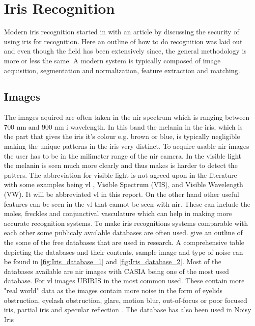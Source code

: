 \section{Iris Recognition}
\label{sec:Iris_Recognition_Research}
Modern iris recognition started in with an article by \cite{Daugman1993} discussing the security of using iris for recognition. Here an outline of how to do recognition was laid out and even though the field has been  extensively since, the general methodology is more or less the same. A modern system is typically composed of image acquisition, segmentation and normalization, feature extraction and matching. 

\subsection{Images}
The images aquired are often taken in the \gls{nir} spectrum which is ranging between 700 nm and 900 nm i wavelength. In this band the melanin in the iris, which is the part that gives the iris it's colour e.g. brown or blue, is typically negligible making the unique patterns in the iris very distinct. To acquire usable \gls{nir} images the user has to be in the milimeter range of the \gls{nir} camera.  In the visible light the melanin is seen much more clearly and thus makes is harder to detect the patters. The abbreviation for visible light is not agreed upon in the literature with some examples being \gls{vl} , Visible Spectrum (VIS), and Visible Wavelength (VW). It will be abbreviated \gls{vl}  in this report. On the other hand other useful features can be seen in the \gls{vl} that cannot be seen with \gls{nir}. These can include the moles, freckles and conjunctival vasculature which can help in making more accurate recognition systems. To make iris recognitions systems comparable with each other some publicaly available databases are often used. \cite{RifaeeMustafaandAbdallahMohammadandOkosh2017}  give an outline of the some of the free databases that are used in research. A comprehensive table depicting the databases and their contents, sample image and type of noise can be found in \autoref{fig:Iris_database_1} and \autoref{fig:Iris_database_2}. Most of the databases available are \gls{nir} images with CASIA being one of the most used database. For \gls{vl} images UBIRIS in the most common used.  These contain more "real world" data as the images contain more noise in the form of eyelids obstruction, eyelash obstruction, glare, motion blur, out-of-focus or poor focused iris, partial iris and specular reflection \citep{Rattani2017}. The database has also been used in Noisy Iris 